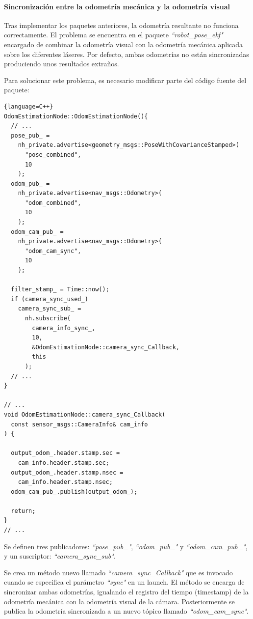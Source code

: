 \paragraph{Sincronización entre la odometría mecánica y la odometría visual}
\hspace{0pt}

Tras implementar los paquetes anteriores, la odometría resultante no funciona
correctamente. El problema se encuentra en el paquete
\textit{``robot\_pose\_ekf"} encargado de combinar la odometría visual con la
odometría mecánica aplicada sobre los diferentes láseres. Por defecto, ambas
odometrías no están sincronizadas produciendo unos resultados extraños.

Para solucionar este problema, es necesario modificar parte del código fuente
del paquete:
\\
\begin{lstlisting}{language=C++}
OdomEstimationNode::OdomEstimationNode(){
  // ...
  pose_pub_ = 
    nh_private.advertise<geometry_msgs::PoseWithCovarianceStamped>(
      "pose_combined",
      10
    );
  odom_pub_ = 
    nh_private.advertise<nav_msgs::Odometry>(
      "odom_combined",
      10
    );
  odom_cam_pub_ = 
    nh_private.advertise<nav_msgs::Odometry>(
      "odom_cam_sync",
      10
    );

  filter_stamp_ = Time::now();
  if (camera_sync_used_)
    camera_sync_sub_ = 
      nh.subscribe(
        camera_info_sync_,
        10,
        &OdomEstimationNode::camera_sync_Callback,
        this
      );
  // ...
}

// ...
void OdomEstimationNode::camera_sync_Callback(
  const sensor_msgs::CameraInfo& cam_info
) {

  output_odom_.header.stamp.sec = 
    cam_info.header.stamp.sec;
  output_odom_.header.stamp.nsec = 
    cam_info.header.stamp.nsec;
  odom_cam_pub_.publish(output_odom_);

  return;
}
// ...
\end{lstlisting}

Se definen tres publicadores: \textit{``pose\_pub\_"}, \textit{``odom\_pub\_"} y
\textit{``odom\_cam\_pub\_"}, y un suscriptor: \textit{``camera\_sync\_sub"}.

Se crea un método nuevo llamado \textit{``camera\_sync\_Callback"} que es
invocado cuando se especifica el parámetro \textit{``sync"} en un launch. El
método se encarga de sincronizar ambas odometrías, igualando el registro del
tiempo (timestamp) de la odometría mecánica con la odometría visual de la
cámara. Posteriormente se publica la odometría sincronizada a un nuevo tópico
llamado \textit{``odom\_cam\_sync"}.

